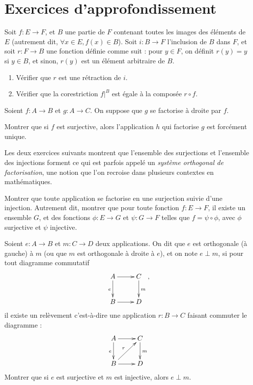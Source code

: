 \section{Exercices d'approfondissement}


\begin{exercice}
Soit $f : E\to F$, et $B$ une partie de $F$ contenant toutes les images des éléments de $E$ (autrement dit, $\forall x\in E, f(x)\in B$).
Soit $i : B\to F$ l'inclusion de $B$ dans $F$, et soit $r : F\to B$ une fonction définie comme suit : pour $y\in F$, on définit $r(y)=y$ si $y\in B$, et sinon, $r(y)$ est un élément arbitraire de $B$. 
\begin{enumerate}
\item Vérifier que $r$ est une rétraction de $i$.
\item Vérifier que la corestriction $f|^{B}$ est égale à la composée $r\circ f$.
\end{enumerate}
\end{exercice}

\begin{exercice}
Soient $f : A\to B$ et $g : A\to C$. On suppose que $g$ se factorise à droite par $f$.

Montrer que si $f$ est surjective, alors l'application $h$ qui factorise $g$ est forcément unique.
\end{exercice}


Les deux exercices suivants montrent que l'ensemble des surjections et l'ensemble des injections forment ce qui est parfois appelé un \emph{système orthogonal de factorisation}, une notion que l'on recroise dans plusieurs contextes en mathématiques.

\begin{exercice}
Montrer que toute application se factorise en une surjection suivie d'une injection. Autrement dit, montrer que pour toute fonction $f : E\to F$, il existe un ensemble $G$, et des fonctions $\phi : E\to G$ et $\psi : G\to F$ telles que $f = \psi\circ \phi$, avec $\phi$ surjective et $\psi$ injective.
\end{exercice}

\begin{exercice}
Soient $e : A\to B$ et $m : C\to D$ deux applications. On dit que $e$ est orthogonale (à gauche) à $m$ (ou que $m$ est orthogonale à droite à $e$), et on note $e\perp m$, si pour tout diagramme commutatif
\[
\xymatrix{
A \ar[r] \ar[d]_{e}& C\ar[d]^{m}\\
B \ar[r]& D 
},
\]
il existe un relèvement c'est-à-dire une application $r : B\to C$ faisant commuter le diagramme :
\[
\xymatrix{
A \ar[r] \ar[d]_{e}& C\ar[d]^{m}\\
B \ar[r]\ar[ur]^{r}& D 
}
\]
Montrer que si $e$ est surjective et $m$ est injective, alors $e\perp m$.
\end{exercice}

